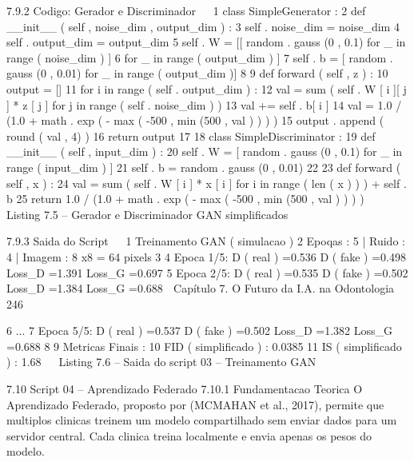    7.9.2     Codigo: Gerador e Discriminador
                                                                                                         
 1 class SimpleGenerator :
 2     def __init__ ( self , noise_dim , output_dim ) :
 3         self . noise_dim = noise_dim
 4         self . output_dim = output_dim
 5         self . W = [[ random . gauss (0 , 0.1) for _ in range ( noise_dim ) ]
 6                       for _ in range ( output_dim ) ]
 7         self . b = [ random . gauss (0 , 0.01) for _ in range ( output_dim )]
 8
 9     def forward ( self , z ) :
10         output = []
11         for i in range ( self . output_dim ) :
12              val = sum ( self . W [ i ][ j ] * z [ j ] for j in range ( self . noise_dim ) )
13              val += self . b[ i ]
14              val = 1.0 / (1.0 + math . exp ( - max ( -500 , min (500 , val ) ) ) )
15              output . append ( round ( val , 4) )
16         return output
17
18 class SimpleDiscriminator :
19     def __init__ ( self , input_dim ) :
20         self . W = [ random . gauss (0 , 0.1) for _ in range ( input_dim ) ]
21         self . b = random . gauss (0 , 0.01)
22
23     def forward ( self , x ) :
24         val = sum ( self . W [ i ] * x [ i ] for i in range ( len ( x ) ) ) + self . b
25         return 1.0 / (1.0 + math . exp ( - max ( -500 , min (500 , val ) ) ) )
                                                                                                         
                       Listing 7.5 – Gerador e Discriminador GAN simplificados


    7.9.3     Saida do Script
                                                                                                         
1       Treinamento GAN ( simulacao )
2       Epoqas : 5 | Ruido : 4 | Imagem : 8 x8 = 64 pixels
3
4       Epoca 1/5: D ( real ) =0.536 D ( fake ) =0.498 Loss_D =1.391 Loss_G =0.697
5       Epoca 2/5: D ( real ) =0.535 D ( fake ) =0.502 Loss_D =1.384 Loss_G =0.688
     Capítulo 7. O Futuro da I.A. na Odontologia                                      246


 6       ...
 7       Epoca 5/5: D ( real ) =0.537 D ( fake ) =0.502 Loss_D =1.382 Loss_G =0.688
 8
 9       Metricas Finais :
10         FID ( simplificado ) : 0.0385
11         IS ( simplificado ) : 1.68
                                                                                           
                         Listing 7.6 – Saida do script 03 – Treinamento GAN



     7.10       Script 04 – Aprendizado Federado
     7.10.1      Fundamentacao Teorica
     O Aprendizado Federado, proposto por (MCMAHAN et al., 2017), permite que multiplos
     clinicas treinem um modelo compartilhado sem enviar dados para um servidor
     central. Cada clinica treina localmente e envia apenas os pesos do modelo.


